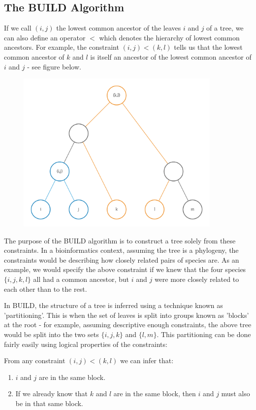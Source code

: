 \documentclass[11pt]{article} %
\begin{document}
\subsection{The BUILD Algorithm}
If we call $(i,j)$ the lowest common ancestor of the leaves $i$ and $j$ of a tree, we can also define an operator $<$ which denotes the hierarchy of lowest common ancestors. For example, the constraint $(i,j)<(k,l)$ tells us that the lowest common ancestor of $k$ and $l$ is itself an ancestor of the lowest common ancestor of $i$ and $j$ - see figure below.

\begin{figure}
	\centering
	\includegraphics[width=10cm]{buildexample}
\end{figure}

The purpose of the BUILD algorithm is to construct a tree solely from these constraints. In a bioinformatics context, assuming the tree is a phylogeny, the constraints would be describing how closely related pairs of species are. As an example, we would specify the above constraint if we knew that the four species $\{i,j,k,l\}$ all had a common ancestor, but $i$ and $j$ were more closely related to each other than to the rest.

In BUILD, the structure of a tree is inferred using a technique known as 'partitioning'. This is when the set of leaves is split into groups known as 'blocks' at the root - for example, assuming descriptive enough constraints, the above tree would be split into the two sets $\{i,j,k\}$ and $\{l,m\}$. This partitioning can be done fairly easily using logical properties of the constraints:

From any constraint $(i,j)<(k,l)$ we can infer that:
\begin{enumerate}
	\item $i$ and $j$ are in the same block.
	\item If we already know that $k$ and $l$ are in the same block, then $i$ and $j$ must also be in that same block.
\end{enumerate}
\end{document}

